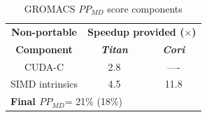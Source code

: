 \begin{table}[htbp]
\caption{GROMACS $PP_{MD}$ score components }
\begin{center}
\begin{tabular}{|c|c|c|}
\hline
\textbf{Non-portable}&\multicolumn{2}{|c|}{\textbf{Speedup provided ($\times$)}} \\
\cline{2-3} 
\textbf{Component} & \textbf{\textit{Titan}}&  \textbf{\textit{Cori}} \\
\hline
CUDA-C& 2.8& ----  \\
\hline
SIMD intrinsics& 4.5& 11.8  \\
\hline
\multicolumn{3}{l}{\textbf{Final $PP_{MD}$}= 21\% (18\%)} \\
\hline
\end{tabular}
\label{gmx_ppmd}
\end{center}
\end{table}
